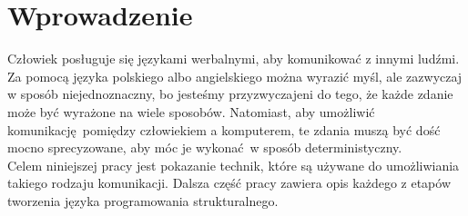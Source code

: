 \section{Wprowadzenie}

	Człowiek posługuje się językami werbalnymi, aby komunikować z innymi ludźmi. Za pomocą
	języka polskiego albo angielskiego można wyrazić myśl, ale zazwyczaj w sposób niejednoznaczny,
	bo jesteśmy przyzwyczajeni do tego, że każde zdanie może być wyrażone na wiele sposobów. Natomiast,
	aby umożliwić komunikację pomiędzy człowiekiem a komputerem, te zdania muszą być dość mocno
	sprecyzowane, aby móc je wykonać w sposób deterministyczny.
	\\
	
	Celem niniejszej pracy jest pokazanie technik, które są używane do umożliwiania takiego rodzaju
	komunikacji. Dalsza część pracy zawiera opis każdego z etapów tworzenia języka programowania
	strukturalnego. 
